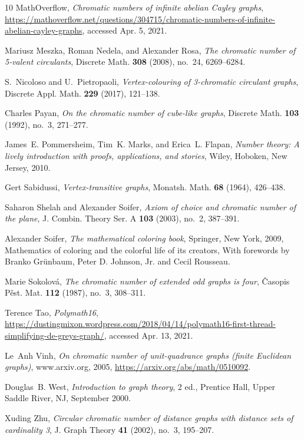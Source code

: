 \documentclass{article}
\theoremstyle{definition}
\theoremstyle{remark}
\begin{document}
\begin{thebibliography}{10}
{MathOverflow}, \emph{{C}hromatic numbers of infinite abelian {C}ayley graphs},
  \url{https://mathoverflow.net/questions/304715/chromatic-numbers-of-infinite-abelian-cayley-graphs},
  accessed {A}pr. 5, 2021.

Mariusz Meszka, Roman Nedela, and Alexander Rosa, \emph{The chromatic number of
  5-valent circulants}, Discrete Math. \textbf{308} (2008), no.~24, 6269--6284.

S.~Nicoloso and U.~Pietropaoli, \emph{Vertex-colouring of 3-chromatic circulant
  graphs}, Discrete Appl. Math. \textbf{229} (2017), 121--138. 

Charles Payan, \emph{On the chromatic number of cube-like graphs}, Discrete
  Math. \textbf{103} (1992), no.~3, 271--277. 

James~E. Pommersheim, Tim~K. Marks, and Erica~L. Flapan, \emph{Number theory: A
  lively introduction with proofs, applications, and stories}, Wiley, Hoboken,
  New Jersey, 2010.

Gert Sabidussi, \emph{Vertex-transitive graphs}, Monatsh. Math. \textbf{68}
  (1964), 426--438. 

Saharon Shelah and Alexander Soifer, \emph{Axiom of choice and chromatic number
  of the plane}, J. Combin. Theory Ser. A \textbf{103} (2003), no.~2, 387--391.

Alexander Soifer, \emph{The mathematical coloring book}, Springer, New York,
  2009, Mathematics of coloring and the colorful life of its creators, With
  forewords by Branko Gr\"{u}nbaum, Peter D. Johnson, Jr. and Cecil Rousseau.

Marie Sokolov\'{a}, \emph{The chromatic number of extended odd graphs is four},
  \v{C}asopis P\v{e}st. Mat. \textbf{112} (1987), no.~3, 308--311. 

Terence Tao, \emph{Polymath16},
  \url{https://dustingmixon.wordpress.com/2018/04/14/polymath16-first-thread-simplifying-de-greys-graph/},
  accessed {A}pr. 13, 2021.

Le~Anh Vinh, \emph{On chromatic number of unit-quadrance graphs (finite
  {E}uclidean graphs)}, www.arxiv.org, 2005,
  \url{https://arxiv.org/abs/math/0510092}.

Douglas~B. West, \emph{Introduction to graph theory}, 2 ed., Prentice Hall,
  Upper Saddle River, NJ, September 2000.

Xuding Zhu, \emph{Circular chromatic number of distance graphs with distance
  sets of cardinality 3}, J. Graph Theory \textbf{41} (2002), no.~3, 195--207.

\end{thebibliography}


% 
% 
\end{document}
